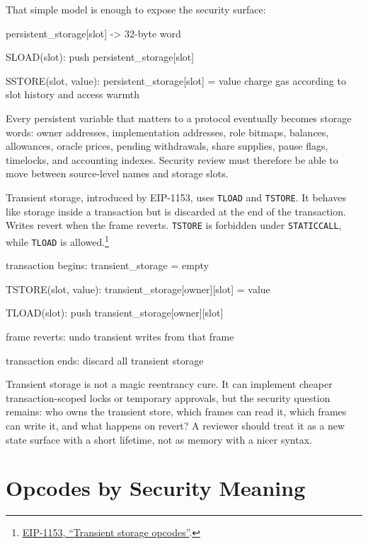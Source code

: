 That simple model is enough to expose the security surface:

\begin{codeblock}
persistent_storage[slot] -> 32-byte word

SLOAD(slot):
    push persistent_storage[slot]

SSTORE(slot, value):
    persistent_storage[slot] = value
    charge gas according to slot history and access warmth
\end{codeblock}

Every persistent variable that matters to a protocol eventually becomes storage words: owner addresses, implementation addresses, role bitmaps, balances, allowances, oracle prices, pending withdrawals, share supplies, pause flags, timelocks, and accounting indexes. Security review must therefore be able to move between source-level names and storage slots.

Transient storage, introduced by EIP-1153, uses \texttt{TLOAD} and \texttt{TSTORE}. It behaves like storage inside a transaction but is discarded at the end of the transaction. Writes revert when the frame reverts. \texttt{TSTORE} is forbidden under \texttt{STATICCALL}, while \texttt{TLOAD} is allowed.\footnote{\href{https://eips.ethereum.org/EIPS/eip-1153}{EIP-1153, ``Transient storage opcodes''}.}

\begin{codeblock}
transaction begins:
    transient_storage = empty

TSTORE(slot, value):
    transient_storage[owner][slot] = value

TLOAD(slot):
    push transient_storage[owner][slot]

frame reverts:
    undo transient writes from that frame

transaction ends:
    discard all transient storage
\end{codeblock}

Transient storage is not a magic reentrancy cure. It can implement cheaper transaction-scoped locks or temporary approvals, but the security question remains: who owns the transient store, which frames can read it, which frames can write it, and what happens on revert? A reviewer should treat it as a new state surface with a short lifetime, not as memory with a nicer syntax.

\section{Opcodes by Security Meaning}

